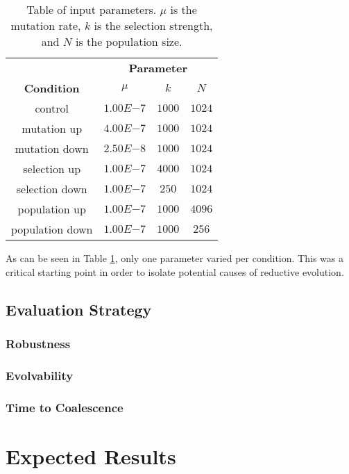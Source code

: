 \begin{table}[h]
	\centering
	\begin{tabular}{|c||c|c|c|}
		\hline
		 & \multicolumn{3}{c|}{\textbf{Parameter}} \\
		\cline{2-4}
		\textbf{Condition} &$\mu$ & $k$ & $N$ \\
		\hline
		control & $1.00E{-7}$ & $1000$ & $1024$ \\
		\hline
		mutation up & $4.00E{-7}$ & $1000$ & $1024$ \\
		\hline
		mutation down & $2.50E{-8}$ & $1000$ & $1024$ \\
		\hline
		selection up & $1.00E{-7}$ & $4000$ & $1024$ \\
		\hline
		selection down & $1.00E{-7}$ & $250$ & $1024$ \\
		\hline
		population up & $1.00E{-7}$ & $1000$ & $4096$ \\
		\hline
		population down & $1.00E{-7}$ & $1000$ & $256$ \\		
		\hline
	\end{tabular}
	\caption[Table of parameters]{Table of input parameters. $\mu$ is the mutation rate, $k$ is the selection strength, and $N$ is the population size.}
	\label{table:parameters}
\end{table}
As can be seen in Table \ref{table:parameters}, only one parameter varied per condition. This was a critical starting point in order to isolate potential causes of reductive evolution.
\subsection{Evaluation Strategy}
\subsubsection{Robustness}
\subsubsection{Evolvability}
\subsubsection{Time to Coalescence}

\section{Expected Results}




